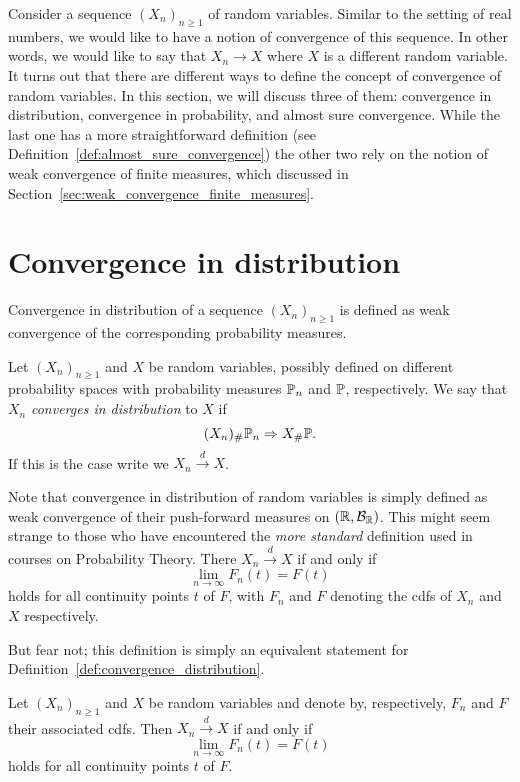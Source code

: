 
Consider a sequence $(X_n)_{n \ge 1}$ of random variables. Similar to the setting of real numbers, we would like to have a notion of convergence of this sequence. In other words, we would like to say that $X_n \to X$ where $X$ is a different random variable. It turns out that there are different ways to define the concept of convergence of random variables. In this section, we will discuss three of them: convergence in distribution, convergence in probability, and almost sure convergence. While the last one has a more straightforward definition (see Definition~\ref{def:almost_sure_convergence}) the other two rely on the notion of weak convergence of finite measures, which discussed in Section~\ref{sec:weak_convergence_finite_measures}.

\section{Convergence in distribution}

Convergence in distribution of a sequence $(X_n)_{n \ge 1}$ is defined as weak convergence of the corresponding probability measures.

\begin{definition}\label{def:convergence_distribution}
Let $(X_n)_{n \ge 1}$ and $X$ be random variables, possibly defined on different probability spaces with probability measures $\mathbb P_n$ and $\mathbb P$, respectively. We say that $X_n$ \emph{converges in distribution} to $X$ if
\[
	(X_n)_\# \mathbb P_n \Rightarrow X_\# \mathbb P.
\]
If this is the case write we $X_n \stackrel{d}{\rightarrow} X$.
\end{definition}

Note that convergence in distribution of random variables is simply defined as weak convergence of their push-forward measures on $(\mathbb R, \mathcal B_{\mathbb R})$. This might seem strange to those who have encountered the \emph{more standard} definition used in courses on Probability Theory. There $X_n \stackrel{d}{\rightarrow} X$ if and only if
\[
	\lim_{n \to \infty} F_n(t) = F(t)
\]
holds for all continuity points $t$ of $F$, with $F_n$ and $F$ denoting the cdfs of $X_n$ and $X$ respectively.

But fear not; this definition is simply an equivalent statement for Definition~\ref{def:convergence_distribution}. 


\begin{lemma}\label{lem:convergence_distribution_cdfs}
Let $(X_n)_{n \ge 1}$ and $X$ be random variables and denote by, respectively, $F_n$ and $F$ their associated cdfs. Then
$X_n \stackrel{d}{\rightarrow} X$ if and only if
\[
	\lim_{n \to \infty} F_n(t) = F(t)
\]
holds for all continuity points $t$ of $F$.
\end{lemma}

